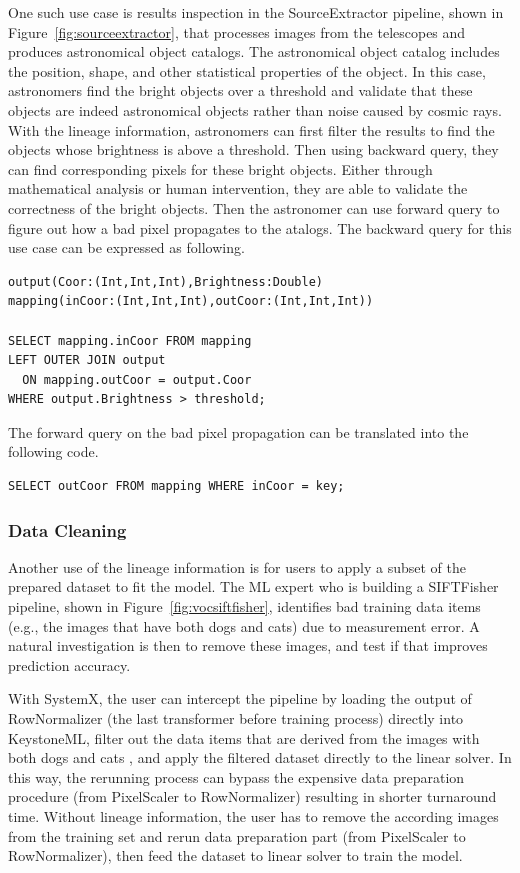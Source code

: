\documentclass{sig-alternate}
\begin{document}
One such use case is results inspection in the SourceExtractor pipeline, shown in Figure~\ref{fig:sourceextractor},
that processes images from the telescopes and produces astronomical object catalogs. 
The astronomical object catalog includes the position, shape, and other statistical properties of the object.
In this case, astronomers find the bright objects over a threshold and validate that these objects are indeed astronomical objects rather
than noise caused by cosmic rays.
With the lineage information, astronomers can first filter the results to find the objects whose brightness is above a threshold.
Then using backward query, they can find corresponding pixels for these bright objects. 
Either through mathematical analysis or human intervention, they are able to validate the correctness of the bright objects.
Then the astronomer can use forward query to figure out how a bad pixel propagates to the atalogs.
The backward query for this use case can be expressed as following.
\begin{lstlisting}
output(Coor:(Int,Int,Int),Brightness:Double)
mapping(inCoor:(Int,Int,Int),outCoor:(Int,Int,Int))

SELECT mapping.inCoor FROM mapping 
LEFT OUTER JOIN output
  ON mapping.outCoor = output.Coor
WHERE output.Brightness > threshold;
\end{lstlisting}

The forward query on the bad pixel propagation can be translated into the following code.
\begin{lstlisting}
SELECT outCoor FROM mapping WHERE inCoor = key;
\end{lstlisting}

\subsubsection{Data Cleaning}
\label{sec:Back-Case-Cleaning}
Another use of the lineage information is for users to apply a subset of the prepared dataset to fit the model. 
The ML expert who is building a SIFTFisher pipeline, shown in Figure~\ref{fig:vocsiftfisher}, identifies bad 
training data items (e.g., the images that have both dogs and cats) due to measurement error. 
A natural investigation is then to remove these images, and test if that improves prediction accuracy.

With SystemX, the user can intercept the pipeline by loading the output of RowNormalizer (the last transformer before training process) 
directly into KeystoneML, filter out the data items that are derived from the images with both dogs and cats , 
and apply the filtered dataset directly to the linear solver.
In this way, the rerunning process can bypass the expensive data preparation procedure (from PixelScaler to RowNormalizer) 
resulting in shorter turnaround time.
Without lineage information, the user has to remove the according images from the training set and rerun data
preparation part (from PixelScaler to RowNormalizer), then feed the dataset to linear solver to train the model.
\end{document}
